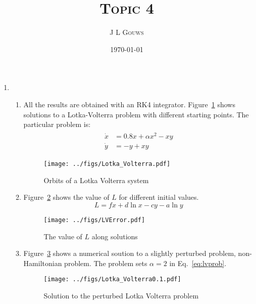\documentclass[12pt,a4]{article}
\title{
\textsc{Topic 4}
}
\author{\textsc{J L Gouws}
}
\date{\today
\\[1cm]}
\begin{document}
\thispagestyle{empty}

\maketitle

\begin{enumerate}
  \item
    \begin{enumerate}
      \item
        All the results are obtained with an RK4 integrator.
        Figure~\ref{fig:Lotka_Volterra} shows solutions to a Lotka-Volterra problem with different starting points.
        The particular problem is:
        \begin{align}
          \begin{split}
            \dot x &= 0.8 x + \alpha x^2 - xy\\
            \dot y &= - y + xy
          \end{split}
          \label{eq:lvprob}
        \end{align}
        \begin{figure}[H]
          \centering
          \texttt{[image: ../figs/Lotka\_Volterra.pdf]} 
          \caption{Orbits of a Lotka Volterra system}
          \label{fig:Lotka_Volterra}
        \end{figure}

      \item
        Figure~\ref{fig:LVError} shows the value of $L$ for different initial values.
        \begin{equation*}
          L = f x + d \ln x - cy - a \ln y
        \end{equation*}

        \begin{figure}[H]
          \centering
          \texttt{[image: ../figs/LVError.pdf]}
          \caption{The value of $L$ along solutions}
          \label{fig:LVError}
        \end{figure}

      \item
        Figure~\ref{fig:Lotka_Volterra0.1} shows a numerical soution to a slightly perturbed problem, non-Hamiltonian problem.
        The problem sets $\alpha = 2 $ in Eq.~\ref{eq:lvprob}.
        \begin{figure}[H]
          \centering
          \texttt{[image: ../figs/Lotka\_Volterra0.1.pdf]}
          \caption{Solution to the perturbed Lotka Volterra problem}
          \label{fig:Lotka_Volterra0.1}
        \end{figure}


\end{enumerate}
\end{enumerate}
\end{document}
